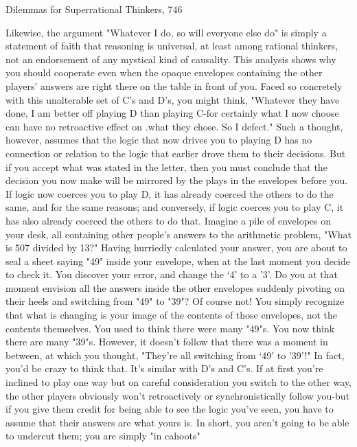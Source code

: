 Dilemmas for Superrational Thinkers,                                                  746

Likewise, the argument "Whatever I do, so will everyone else do" is simply a
statement of faith that reasoning is universal, at least among rational thinkers, not an
endorsement of any mystical kind of causality.
        This analysis shows why you should cooperate even when the opaque
envelopes containing the other players' answers are right there on the table in front of
you. Faced so concretely with this unalterable set of C's and D's, you might think,
"Whatever they have done, I am better off playing D than playing C-for certainly
what I now choose can have no retroactive effect on .what they chose. So I defect."
Such a thought, however, assumes that the logic that now drives you to playing D has
no connection or relation to the logic that earlier drove them to their decisions. But if
you accept what was stated in the letter, then you must conclude that the decision you
now make will be mirrored by the plays in the envelopes before you. If logic now
coerces you to play D, it has already coerced the others to do the same, and for the
same reasons; and conversely, if logic coerces you to play C, it has also already
coerced the others to do that.
        Imagine a pile of envelopes on your desk, all containing other people's
answers to the arithmetic problem, "What is 507 divided by 13?" Having hurriedly
calculated your answer, you are about to seal a sheet saying "49" inside your
envelope, when at the last moment you decide to check it. You discover your error,
and change the `4' to a '3'. Do you at that moment envision all the answers inside the
other envelopes suddenly pivoting on their heels and switching from "49" to "39"? Of
course not! You simply recognize that what is changing is your image of the contents
of those envelopes, not the contents themselves. You used to think there were many
"49"s. You now think there are many "39"s. However, it doesn't follow that there was
a moment in between, at which you thought, "They're all switching from `49' to '39'!"
In fact, you'd be crazy to think that.
        It's similar with D's and C's. If at first you're inclined to play one way but on
careful consideration you switch to the other way, the other players obviously won't
retroactively or synchronistically follow you-but if you give them credit for being able
to see the logic you've seen, you have to assume that their answers are what yours is.
In short, you aren't going to be able to undercut them; you are simply "in cahoots"
